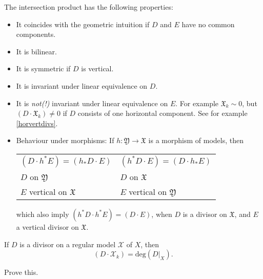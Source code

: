The intersection product has the following properties:
\begin{itemize}
	\item It coincides with the geometric intuition if $D$ and $E$ have no common components.
	\item It is bilinear.
	\item It is symmetric if $D$ is vertical.
	\item It is invariant under linear equivalence on $D$.
	\item It is \emph{not(!)} invariant under linear equivalence on $E$.
		For example $\mathfrak{X}_{k} \sim 0$, but $(D \cdot
		\mathfrak{X}_{k}) \ne 0$ if $D$ consists of one horizontal
		component. See for example \cref{horvertdivs}.
	\item Behaviour under morphisms: If $h \colon \mathfrak{Y} \to
		\mathfrak{X}$ is a morphism of models, then
		\begin{center}
			\begin{tabular}{ll}
				$(D \cdot h^{*}E) = (h_{*}D \cdot E)$ &
				$(h^{*}D \cdot E) = (D \cdot h_{*}E)$ \\
				$D$ on $\mathfrak{Y}$ & $D$ on $\mathfrak{X}$ \\
				$E$ vertical on $\mathfrak{X}$ & $E$ vertical on $\mathfrak{Y}$
			\end{tabular}
		\end{center}
		which also imply $(h^{*}D \cdot h^{*}E) = (D \cdot E)$, when
		$D$ is a divisor on $\mathfrak{X}$, and $E$ a vertical divisor
		on $\mathfrak{X}$.
\end{itemize}

If $D$ is a divisor on a regular model $\mathcal{X}$ of $X$, then 
\[
(D \cdot \mathcal{X}_{k}) = \mathrm{deg}(D|_{X}).
\]
\begin{exercise}
	Prove this.
\end{exercise}

